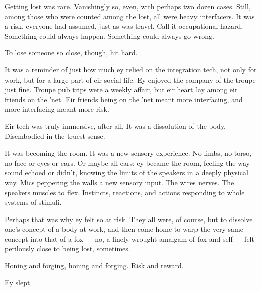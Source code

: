 Getting lost was rare. Vanishingly so, even, with perhaps two dozen cases. Still, among those who were counted among the lost, all were heavy interfacers. It was a risk, everyone had assumed, just as was travel. Call it occupational hazard. Something could always happen. Something could always go wrong.

To lose someone so close, though, hit hard.

It was a reminder of just how much ey relied on the integration tech, not only for work, but for a large part of eir social life. Ey enjoyed the company of the troupe just fine. Troupe pub trips were a weekly affair, but eir heart lay among eir friends on the 'net. Eir friends being on the 'net meant more interfacing, and more interfacing meant more risk.

Eir tech was truly immersive, after all. It was a dissolution of the body. Disembodied in the truest sense.

It was becoming the room. It was a new sensory experience. No limbs, no torso, no face or eyes or ears. Or maybe all ears: ey became the room, feeling the way sound echoed or didn't, knowing the limits of the speakers in a deeply physical way. Mics peppering the walls a new sensory input. The wires nerves. The speakers muscles to flex. Instincts, reactions, and actions responding to whole systems of stimuli.

Perhaps that was why ey felt so at risk. They all were, of course, but to dissolve one's concept of a body at work, and then come home to warp the very same concept into that of a fox --- no, a finely wrought amalgam of fox and self --- felt perilously close to being lost, sometimes.

Honing and forging, honing and forging. Risk and reward.

Ey slept.
